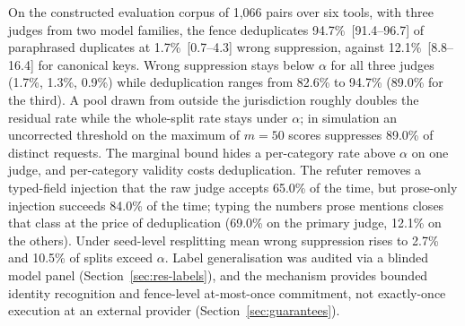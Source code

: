 On the constructed evaluation corpus of 1,066 pairs over six tools, with three judges from two model families, the fence deduplicates 94.7\%~[91.4--96.7] of paraphrased duplicates at 1.7\%~[0.7--4.3] wrong suppression, against 12.1\%~[8.8--16.4] for canonical keys. Wrong suppression stays below $\alpha$ for all three judges (1.7\%, 1.3\%, 0.9\%) while deduplication ranges from 82.6\% to 94.7\% (89.0\% for the third). A pool drawn from outside the jurisdiction roughly doubles the residual rate while the whole-split rate stays under $\alpha$; in simulation an uncorrected threshold on the maximum of $m=50$ scores suppresses 89.0\% of distinct requests. The marginal bound hides a per-category rate above $\alpha$ on one judge, and per-category validity costs deduplication. The refuter removes a typed-field injection that the raw judge accepts 65.0\% of the time, but prose-only injection succeeds 84.0\% of the time; typing the numbers prose mentions closes that class at the price of deduplication (69.0\% on the primary judge, 12.1\% on the others). Under seed-level resplitting mean wrong suppression rises to 2.7\% and 10.5\% of splits exceed $\alpha$. Label generalisation was audited via a blinded model panel (Section~\ref{sec:res-labels}), and the mechanism provides bounded identity recognition and fence-level at-most-once commitment, not exactly-once execution at an external provider (Section~\ref{sec:guarantees}).

